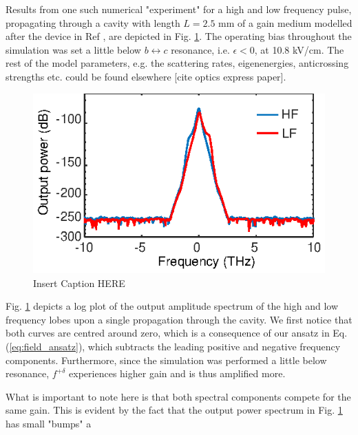 \documentclass[journal]{IEEEtran}
\begin{document}
Results from one such numerical "experiment" for a high and low frequency pulse, propagating through a cavity with length $L = 2.5$ mm of a gain medium modelled after the device in Ref \cite{burghoff2014terahertz}, are depicted in Fig. \ref{fig:img04}. The operating bias throughout the simulation was set a little below $b\leftrightarrow c$ resonance, i.e. $\epsilon <0$, at 10.8 kV/cm. The rest of the model parameters, e.g. the scattering rates, eigenenergies, anticrossing strengths etc. could be found elsewhere [cite optics express paper].
\begin{figure}[h!]
	\begin{center}
		\includegraphics[scale=1.0]{IMGS/THzTDs.eps}
		\caption{ Insert Caption HERE} \label{fig:img04}
	\end{center}	
\end{figure}

Fig. \ref{fig:img04} depicts a log plot of the output amplitude spectrum of the high and low frequency lobes upon a single propagation through the cavity. We first notice that both curves are centred around zero, which is a consequence of our ansatz in Eq. (\ref{eq:field_ansatz}), which subtracts the leading positive and negative frequency components. Furthermore, since the simulation was performed a little below resonance, $f^{+\delta}$ experiences higher gain and is thus amplified more.  

What is important to note here is that both spectral components compete for the same gain. This is evident by the fact that the output power spectrum in Fig. \ref{fig:img04} has small "bumps" a
  
\label{a:appendix01}
\end{document}
